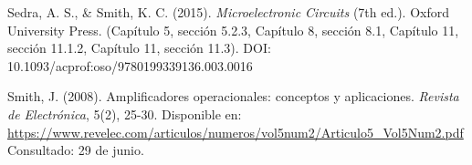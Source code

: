 \documentclass[a4paper,12pt,spanish]{article}
\begin{document}
\begin{thebibliography}{9}
      Sedra, A. S., \& Smith, K. C. (2015). \textit{Microelectronic Circuits} (7th ed.). Oxford University Press. (Capítulo 5, sección 5.2.3, Capítulo 8, sección 8.1, Capítulo 11, sección 11.1.2, Capítulo 11, sección 11.3). DOI: 10.1093/acprof:oso/9780199339136.003.0016
    
      Smith, J. (2008). Amplificadores operacionales: conceptos y aplicaciones. \textit{Revista de Electrónica}, 5(2), 25-30. Disponible en: \url{https://www.revelec.com/articulos/numeros/vol5num2/Articulo5_Vol5Num2.pdf} Consultado: 29 de junio.

\end{thebibliography}
\end{document}
